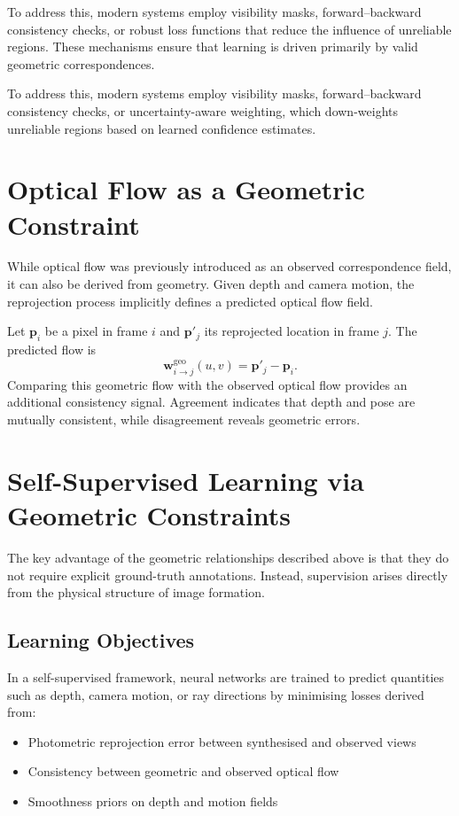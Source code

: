 To address this, modern systems employ visibility masks, forward--backward consistency checks, or robust loss functions that reduce the influence of unreliable regions. These mechanisms ensure that learning is driven primarily by valid geometric correspondences.

To address this, modern systems employ visibility masks, forward--backward consistency checks, or uncertainty-aware weighting, which down-weights unreliable regions based on learned confidence estimates.

\section{Optical Flow as a Geometric Constraint}
While optical flow was previously introduced as an observed correspondence field, it can also be derived from geometry. Given depth and camera motion, the reprojection process implicitly defines a predicted optical flow field.

Let $\mathbf{p}_i$ be a pixel in frame $i$ and $\mathbf{p}'_j$ its reprojected location in frame $j$. The predicted flow is
\begin{equation}
    \mathbf{w}^{\text{geo}}_{i\to j}(u,v) = \mathbf{p}'_j - \mathbf{p}_i.
\end{equation}
Comparing this geometric flow with the observed optical flow provides an additional consistency signal. Agreement indicates that depth and pose are mutually consistent, while disagreement reveals geometric errors.

\section{Self-Supervised Learning via Geometric Constraints}
The key advantage of the geometric relationships described above is that they do not require explicit ground-truth annotations. Instead, supervision arises directly from the physical structure of image formation.

\subsection{Learning Objectives}
In a self-supervised framework, neural networks are trained to predict quantities such as depth, camera motion, or ray directions by minimising losses derived from:

\begin{itemize}
    \item Photometric reprojection error between synthesised and observed views
    \item Consistency between geometric and observed optical flow
    \item Smoothness priors on depth and motion fields
\end{itemize}

